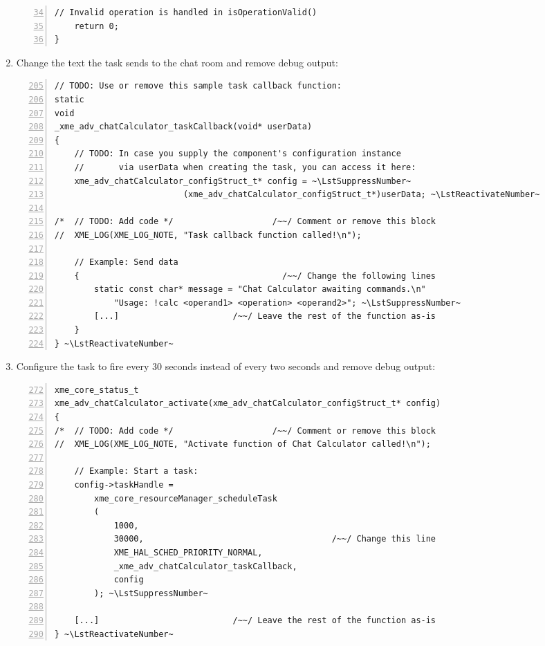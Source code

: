 \begin{enumerate}
\begin{lstlisting}[numbers=left,firstnumber=34]
	// Invalid operation is handled in isOperationValid()
	return 0;
}
\end{lstlisting}

	\item Change the text the task sends to the chat room and remove debug output:

\begin{lstlisting}[numbers=left,firstnumber=205]
// TODO: Use or remove this sample task callback function:
static
void
_xme_adv_chatCalculator_taskCallback(void* userData)
{
	// TODO: In case you supply the component's configuration instance
	//       via userData when creating the task, you can access it here:
	xme_adv_chatCalculator_configStruct_t* config = ~\LstSuppressNumber~
                          (xme_adv_chatCalculator_configStruct_t*)userData; ~\LstReactivateNumber~

/*	// TODO: Add code */                    /~~/ Comment or remove this block
//	XME_LOG(XME_LOG_NOTE, "Task callback function called!\n");

	// Example: Send data
	{                                         /~~/ Change the following lines
		static const char* message = "Chat Calculator awaiting commands.\n"
			"Usage: !calc <operand1> <operation> <operand2>"; ~\LstSuppressNumber~
		[...]                       /~~/ Leave the rest of the function as-is
	}
} ~\LstReactivateNumber~
\end{lstlisting}

	\item Configure the task to fire every 30 seconds instead of every two seconds
		and remove debug output:

\begin{lstlisting}[numbers=left,firstnumber=272]
xme_core_status_t
xme_adv_chatCalculator_activate(xme_adv_chatCalculator_configStruct_t* config)
{
/*	// TODO: Add code */                    /~~/ Comment or remove this block
//	XME_LOG(XME_LOG_NOTE, "Activate function of Chat Calculator called!\n");

	// Example: Start a task:
	config->taskHandle =
		xme_core_resourceManager_scheduleTask
		(
			1000,
			30000,                                      /~~/ Change this line
			XME_HAL_SCHED_PRIORITY_NORMAL,
			_xme_adv_chatCalculator_taskCallback,
			config
		); ~\LstSuppressNumber~

	[...]                           /~~/ Leave the rest of the function as-is
} ~\LstReactivateNumber~
\end{lstlisting}


\end{enumerate}

